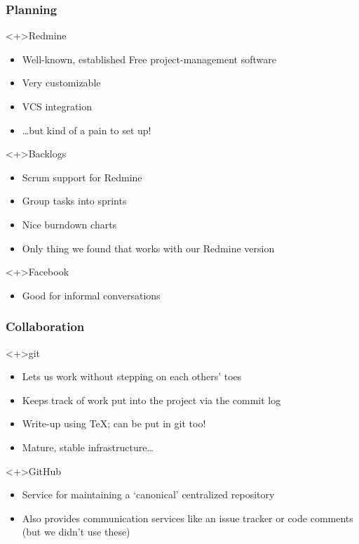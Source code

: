 
\begin{frame}
  \frametitle{Planning}

  \begin{block}<+>{Redmine}
    \begin{itemize}
      \item Well-known, established Free project-management software
      \item Very customizable
      \item VCS integration
      \item \ldots but kind of a pain to set up!
    \end{itemize}
  \end{block}

  \begin{block}<+>{Backlogs}
    \begin{itemize}
      \item Scrum support for Redmine
      \item Group tasks into sprints
      \item Nice burndown charts
      \item Only thing we found that works with our Redmine version \smiley
    \end{itemize}
  \end{block}

  \begin{block}<+>{Facebook}
    \begin{itemize}
      \item Good for informal conversations
    \end{itemize}
  \end{block}
\end{frame}

\begin{frame}
  \frametitle{Collaboration}

  \begin{block}<+>{git}
    \begin{itemize}
      \item Lets us work without stepping on each others' toes
      \item Keeps track of work put into the project via the commit log
      \item Write-up using \TeX; can be put in git too!
      \item Mature, stable infrastructure\ldots
    \end{itemize}
  \end{block}

  \begin{block}<+>{GitHub}
    \begin{itemize}
      \item Service for maintaining a `canonical' centralized repository
      \item Also provides communication services like an issue tracker
        or code comments (but we didn't use these)
    \end{itemize}
  \end{block}
\end{frame}
